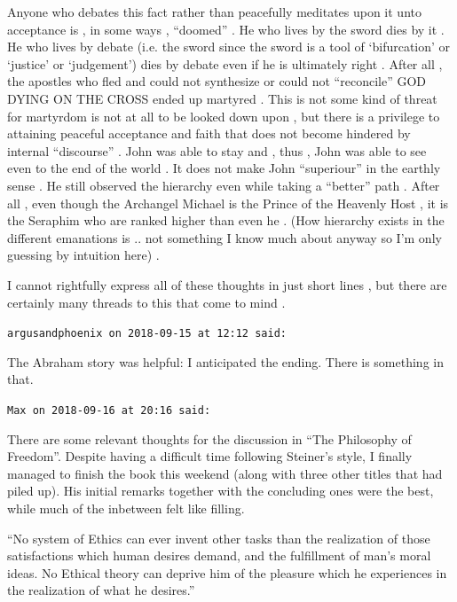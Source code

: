 \begin{footnotesize}
\begin{sffamily}
Anyone who debates this fact rather than peacefully meditates upon it unto acceptance is , in some ways , ``doomed'' . He who lives by the sword dies by it . He who lives by debate (i.e. the sword since the sword is a tool of `bifurcation' or `justice' or `judgement') dies by debate even if he is ultimately right . After all , the apostles who fled and could not synthesize or could not ``reconcile'' GOD DYING ON THE CROSS ended up martyred . This is not some kind of threat for martyrdom is not at all to be looked down upon , but there is a privilege to attaining peaceful acceptance and faith that does not become hindered by internal ``discourse'' . John was able to stay and , thus , John was able to see even to the end of the world . It does not make John ``superiour'' in the earthly sense . He still observed the hierarchy even while taking a ``better'' path . After all , even though the Archangel Michael is the Prince of the Heavenly Host , it is the Seraphim who are ranked higher than even he . (How hierarchy exists in the different emanations is .. not something I know much about anyway so I'm only guessing by intuition here) .

I cannot rightfully express all of these thoughts in just short lines , but there are certainly many threads to this that come to mind .

\hfill

\texttt{argusandphoenix on 2018-09-15 at 12:12 said:}

The Abraham story was helpful: I anticipated the ending. There is something in that.

\hfill

\texttt{Max on 2018-09-16 at 20:16 said:}

There are some relevant thoughts for the discussion in ``The Philosophy of Freedom''. Despite having a difficult time following Steiner's style, I finally managed to finish the book this weekend (along with three other titles that had piled up). His initial remarks together with the concluding ones were the best, while much of the inbetween felt like filling.

``No system of Ethics can ever invent other tasks than the realization of those satisfactions which human desires demand, and the fulfillment of man's moral ideas. No Ethical theory can deprive him of the pleasure which he experiences in the realization of what he desires.''


\end{sffamily}
\end{footnotesize}
